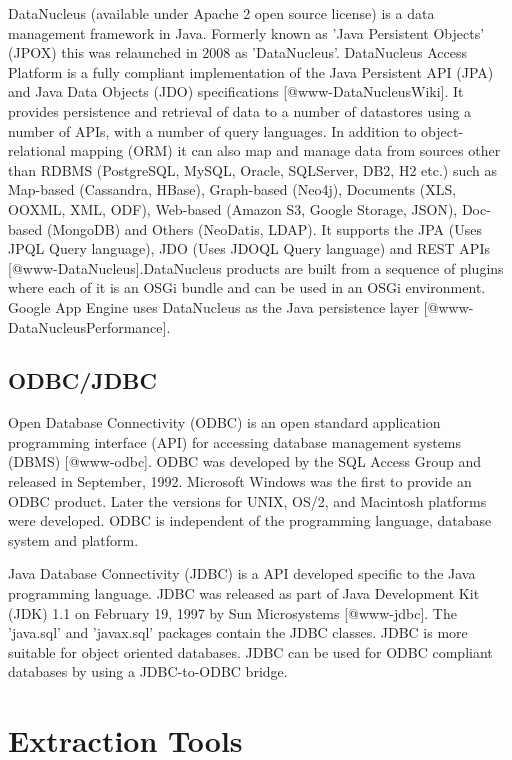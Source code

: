 DataNucleus (available under Apache 2 open source license) is a data
management framework in Java. Formerly known as 'Java Persistent
Objects' (JPOX) this was relaunched in 2008 as
'DataNucleus'. DataNucleus Access Platform is a fully compliant
implementation of the Java Persistent API (JPA) and Java Data Objects
(JDO) specifications [@www-DataNucleusWiki]. It provides
persistence and retrieval of data to a number of datastores using a
number of APIs, with a number of query languages. In addition to
object-relational mapping (ORM) it can also map and manage data from
sources other than RDBMS (PostgreSQL, MySQL, Oracle, SQLServer, DB2,
H2 etc.) such as Map-based (Cassandra, HBase), Graph-based (Neo4j),
Documents (XLS, OOXML, XML, ODF), Web-based (Amazon S3, Google
Storage, JSON), Doc-based (MongoDB) and Others (NeoDatis, LDAP). It
supports the JPA (Uses JPQL Query language), JDO (Uses JDOQL Query
language) and REST APIs [@www-DataNucleus].DataNucleus products
are built from a sequence of plugins where each of it is an OSGi
bundle and can be used in an OSGi environment. Google App Engine uses
DataNucleus as the Java persistence
layer [@www-DataNucleusPerformance].


     
\subsection{ODBC/JDBC}

Open Database Connectivity (ODBC) is an open standard application
programming interface (API) for accessing database management systems
(DBMS) [@www-odbc]. ODBC was developed by the SQL Access Group and
released in September, 1992. Microsoft Windows was the first to
provide an ODBC product. Later the versions for UNIX, OS/2, and
Macintosh platforms were developed. ODBC is independent of the
programming language, database system and platform.

Java Database Connectivity (JDBC) is a API developed specific to the
Java programming language. JDBC was released as part of Java
Development Kit (JDK) 1.1 on February 19, 1997 by Sun
Microsystems [@www-jdbc]. The 'java.sql' and 'javax.sql' packages
contain the JDBC classes. JDBC is more suitable for object oriented
databases. JDBC can be used for ODBC compliant databases by using a
JDBC-to-ODBC bridge.

\section{Extraction Tools}


